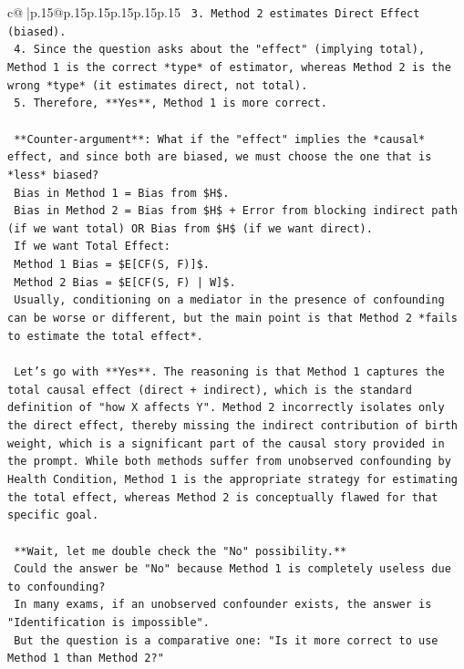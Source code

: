 \documentclass{article}
\begin{document}
{\begin{supertabular}{c@{$\;$}|p{.15\linewidth}@{}p{.15\linewidth}p{.15\linewidth}p{.15\linewidth}p{.15\linewidth}p{.15\linewidth}}
{{{\texttt{    3.  Method 2 estimates Direct Effect (biased).} \\
\texttt{    4.  Since the question asks about the "effect" (implying total), Method 1 is the correct *type* of estimator, whereas Method 2 is the wrong *type* (it estimates direct, not total).} \\
\texttt{    5.  Therefore, **Yes**, Method 1 is more correct.} \\
\\ 
\texttt{    **Counter{-}argument**: What if the "effect" implies the *causal* effect, and since both are biased, we must choose the one that is *less* biased?} \\
\texttt{    Bias in Method 1 = Bias from \$H\$.} \\
\texttt{    Bias in Method 2 = Bias from \$H\$ + Error from blocking indirect path (if we want total) OR Bias from \$H\$ (if we want direct).} \\
\texttt{    If we want Total Effect:} \\
\texttt{    Method 1 Bias = \$E{[}CF(S, F){]}\$.} \\
\texttt{    Method 2 Bias = \$E{[}CF(S, F) | W{]}\$.} \\
\texttt{    Usually, conditioning on a mediator in the presence of confounding can be worse or different, but the main point is that Method 2 *fails to estimate the total effect*.} \\
\\ 
\texttt{    Let's go with **Yes**. The reasoning is that Method 1 captures the total causal effect (direct + indirect), which is the standard definition of "how X affects Y". Method 2 incorrectly isolates only the direct effect, thereby missing the indirect contribution of birth weight, which is a significant part of the causal story provided in the prompt. While both methods suffer from unobserved confounding by Health Condition, Method 1 is the appropriate strategy for estimating the total effect, whereas Method 2 is conceptually flawed for that specific goal.} \\
\\ 
\texttt{    **Wait, let me double check the "No" possibility.**} \\
\texttt{    Could the answer be "No" because Method 1 is completely useless due to confounding?} \\
\texttt{    In many exams, if an unobserved confounder exists, the answer is "Identification is impossible".} \\
\texttt{    But the question is a comparative one: "Is it more correct to use Method 1 than Method 2?"} \\
}}}
\end{supertabular}}
\end{document}
